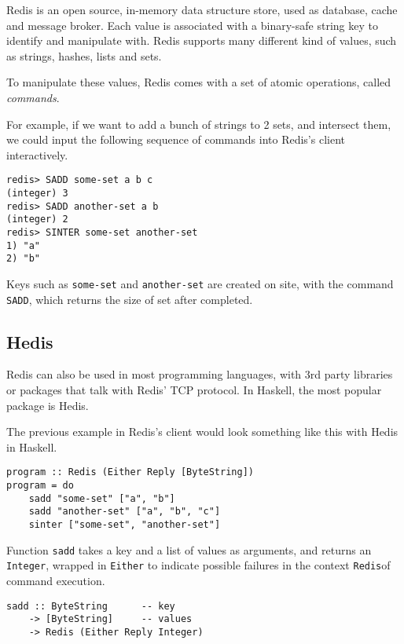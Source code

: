 \documentclass[pldi]{sigplanconf-pldi16}
\begin{document}
Redis is an open source, in-memory data structure store, used as
database, cache and message broker. Each value is associated with a binary-safe
string key to identify and manipulate with. Redis supports many different
kind of values, such as strings, hashes, lists and sets.

To manipulate these values, Redis comes with a set of atomic operations,
called \emph{commands}.

For example, if we want to add a bunch of strings to 2 sets, and intersect them,
we could input the following sequence of commands into Redis's client
interactively.

\begin{verbatim}
redis> SADD some-set a b c
(integer) 3
redis> SADD another-set a b
(integer) 2
redis> SINTER some-set another-set
1) "a"
2) "b"
\end{verbatim}

Keys such as \texttt{some-set} and \texttt{another-set}
are created on site, with the command \texttt{SADD}, which returns
the size of set after completed.

\subsection{Hedis}
Redis can also be used in most programming languages, with 3rd party libraries
or packages that talk with Redis' TCP protocol. In Haskell, the most popular
package is Hedis.

The previous example in Redis's client would look something like this with
Hedis in Haskell.
\begin{verbatim}
program :: Redis (Either Reply [ByteString])
program = do
    sadd "some-set" ["a", "b"]
    sadd "another-set" ["a", "b", "c"]
    sinter ["some-set", "another-set"]
\end{verbatim}

Function \texttt{sadd} takes a key and a list of values as
arguments, and returns an \texttt{Integer}, wrapped in
\texttt{Either} to indicate possible failures in the context
\texttt{Redis}\footnotemark of command execution.

\begin{verbatim}
sadd :: ByteString      -- key
    -> [ByteString]     -- values
    -> Redis (Either Reply Integer)
\end{verbatim}
\end{document}
